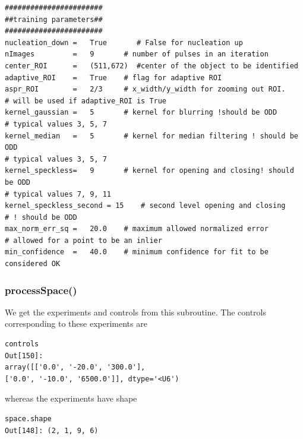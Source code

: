 \documentclass[12pt, twoside, a4paper]{article}
\begin{document}
\begin{verbatim}
#######################
##training parameters##
#######################
nucleation_down =   True       # False for nucleation up
nImages         =   9       # number of pulses in an iteration
center_ROI      =   (511,672)  #center of the object to be identified
adaptive_ROI    =   True    # flag for adaptive ROI
aspr_ROI        =   2/3     # x_width/y_width for zooming out ROI.
# will be used if adaptive_ROI is True
kernel_gaussian =   5       # kernel for blurring !should be ODD
# typical values 3, 5, 7
kernel_median   =   5       # kernel for median filtering ! should be ODD
# typical values 3, 5, 7
kernel_speckless=   9       # kernel for opening and closing! should be ODD
# typical values 7, 9, 11
kernel_speckless_second = 15    # second level opening and closing
# ! should be ODD
max_norm_err_sq =   20.0    # maximum allowed normalized error
# allowed for a point to be an inlier
min_confidence  =   40.0    # minimum confidence for fit to be considered OK
\end{verbatim}
%


\subsubsection{processSpace()}
We get the experiments and controls from this subroutine. The controls corresponding to these experiments are 
\begin{verbatim}
controls
Out[150]: 
array([['0.0', '-20.0', '300.0'],
['0.0', '-10.0', '6500.0']], dtype='<U6')
\end{verbatim}

whereas the experiments have shape
\begin{verbatim}
space.shape
Out[148]: (2, 1, 9, 6)
\end{verbatim}
\end{document}
